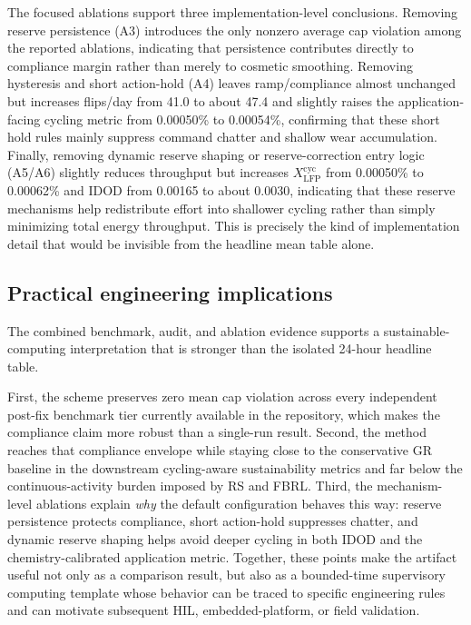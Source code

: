 \documentclass[preprint,12pt]{elsarticle}
\begin{document}
The focused ablations support three implementation-level conclusions. Removing reserve persistence (A3) introduces the only nonzero average cap violation among the reported ablations, indicating that persistence contributes directly to compliance margin rather than merely to cosmetic smoothing. Removing hysteresis and short action-hold (A4) leaves ramp/compliance almost unchanged but increases flips/day from 41.0 to about 47.4 and slightly raises the application-facing cycling metric from 0.00050\% to 0.00054\%, confirming that these short hold rules mainly suppress command chatter and shallow wear accumulation. Finally, removing dynamic reserve shaping or reserve-correction entry logic (A5/A6) slightly reduces throughput but increases $X_{\mathrm{LFP}}^{\mathrm{cyc}}$ from 0.00050\% to 0.00062\% and IDOD from 0.00165 to about 0.0030, indicating that these reserve mechanisms help redistribute effort into shallower cycling rather than simply minimizing total energy throughput. This is precisely the kind of implementation detail that would be invisible from the headline mean table alone.

\subsection*{Practical engineering implications}
The combined benchmark, audit, and ablation evidence supports a sustainable-computing interpretation that is stronger than the isolated 24-hour headline table.\par
First, the scheme preserves zero mean cap violation across every independent post-fix benchmark tier currently available in the repository, which makes the compliance claim more robust than a single-run result. Second, the method reaches that compliance envelope while staying close to the conservative GR baseline in the downstream cycling-aware sustainability metrics and far below the continuous-activity burden imposed by RS and FBRL. Third, the mechanism-level ablations explain \emph{why} the default configuration behaves this way: reserve persistence protects compliance, short action-hold suppresses chatter, and dynamic reserve shaping helps avoid deeper cycling in both IDOD and the chemistry-calibrated application metric. Together, these points make the artifact useful not only as a comparison result, but also as a bounded-time supervisory computing template whose behavior can be traced to specific engineering rules and can motivate subsequent HIL, embedded-platform, or field validation.
\end{document}
